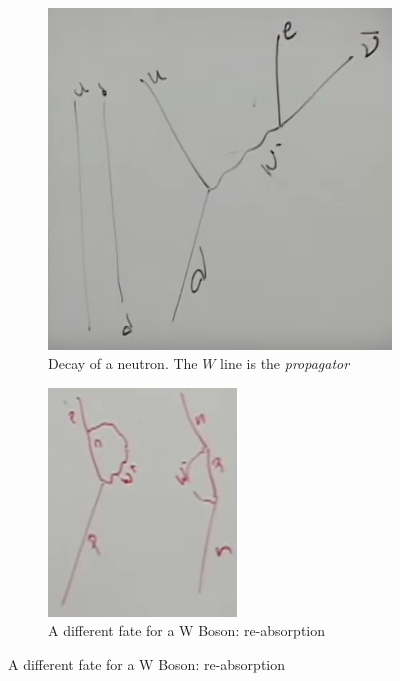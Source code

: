 \documentclass[]{article}
\begin{document}
\begin{figure}[H]
	\caption{Possible fates of a W boson}
	\begin{subfigure}{0.5\textwidth}
		\caption{Decay of a neutron. The $W$ line is the \emph{propagator}}\label{fig:2-6-W1}
		\includegraphics[width=\textwidth]{2-6-W1}
	\end{subfigure}
	\begin{subfigure}{0.4\textwidth}
		\caption{A different fate for a W Boson: re-absorption}\label{fig:absorption:W:boson}
		\includegraphics[width=\textwidth]{2-6-W2}
	\end{subfigure}
\end{figure}
\end{document}
